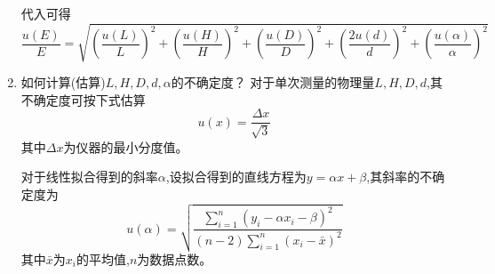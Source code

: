 \documentclass[UTF8]{ctexart}
\begin{document}
\begin{enumerate}
\begin{equation}
    \end{equation}
    代入可得
    \begin{equation}
    \frac{u(E)}{E}=\sqrt{(\frac{u(L)}{L})^2+(\frac{u(H)}{H})^2+(\frac{u(D)}{D})^2+(\frac{2u(d)}{d})^2+(\frac{u(\alpha)}{\alpha})^2}
    \end{equation}
    \item 如何计算(估算)$L,H,D,d,\alpha$的不确定度？
    对于单次测量的物理量$L,H,D,d$,其不确定度可按下式估算
    \begin{equation}
    u(x)=\frac{\Delta x}{\sqrt{3}}
    \end{equation}
    其中$\Delta x$为仪器的最小分度值。
    
    对于线性拟合得到的斜率$\alpha$,设拟合得到的直线方程为$y=\alpha x+\beta$,其斜率的不确定度为
    \begin{equation}
    u(\alpha)=\sqrt{\frac{\sum_{i=1}^n(y_i-\alpha x_i-\beta)^2}{(n-2)\sum_{i=1}^n(x_i-\bar{x})^2}}
    \end{equation}
    其中$\bar{x}$为$x_i$的平均值,$n$为数据点数。
\end{enumerate}
\end{document}
